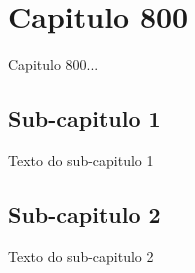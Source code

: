 
\chapter{Capitulo 800}

Capitulo 800...


\section{Sub-capitulo 1}
Texto do sub-capitulo 1

\section{Sub-capitulo 2}
Texto do sub-capitulo 2

